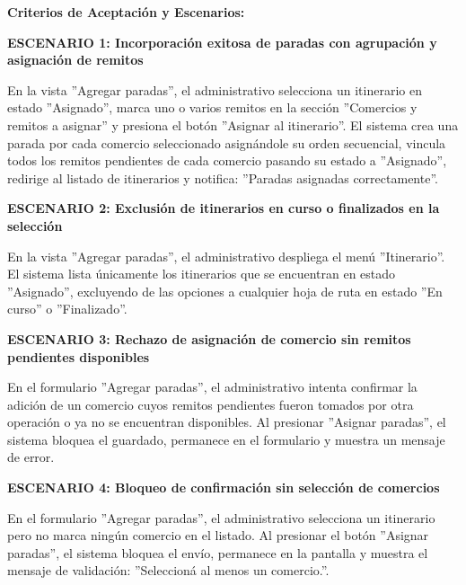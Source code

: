 \documentclass[a4paper,9pt]{article}
\begin{document}
\begin{tcolorbox}[hucard, title={\textbf{HU-46: AGREGAR PARADAS A UN ITINERARIO} \hfill \scriptsize \colorbox{tealstatus}{\textbf{\ Accepted\ }} \quad \colorbox{white}{\textcolor{primarydark}{\textbf{\ 5 pts\ }}}}]
{\begin{itemize}[leftmargin=12pt, nosep, itemsep=1.5pt, topsep=1pt]
\end{itemize}
}\par\vspace{3pt}
\noindent\textbf{\footnotesize Criterios de Aceptación y Escenarios:}\par\vspace{2pt}
{\footnotesize
\noindent\textbf{\textcolor{secondarydark}{ESCENARIO 1:  Incorporación exitosa de paradas con agrupación y asignación de remitos}}\par\vspace{1pt}
En la vista ''Agregar paradas'', el administrativo selecciona un itinerario en estado ''Asignado'', marca uno o varios remitos en la sección ''Comercios y remitos a asignar'' y presiona el botón ''Asignar al itinerario''. El sistema crea una parada por cada comercio seleccionado asignándole su orden secuencial, vincula todos los remitos pendientes de cada comercio pasando su estado a ''Asignado'', redirige al listado de itinerarios y notifica: ''Paradas asignadas correctamente''.\par\vspace{2.5pt}
\noindent\textbf{\textcolor{secondarydark}{ESCENARIO 2:  Exclusión de itinerarios en curso o finalizados en la selección}}\par\vspace{1pt}
En la vista ''Agregar paradas'', el administrativo despliega el menú ''Itinerario''. El sistema lista únicamente los itinerarios que se encuentran en estado ''Asignado'', excluyendo de las opciones a cualquier hoja de ruta en estado ''En curso'' o ''Finalizado''.\par\vspace{2.5pt}
\noindent\textbf{\textcolor{secondarydark}{ESCENARIO 3:  Rechazo de asignación de comercio sin remitos pendientes disponibles}}\par\vspace{1pt}
En el formulario ''Agregar paradas'', el administrativo intenta confirmar la adición de un comercio cuyos remitos pendientes fueron tomados por otra operación o ya no se encuentran disponibles. Al presionar ''Asignar paradas'', el sistema bloquea el guardado, permanece en el formulario y muestra un mensaje de error.\par\vspace{2.5pt}
\noindent\textbf{\textcolor{secondarydark}{ESCENARIO 4:  Bloqueo de confirmación sin selección de comercios}}\par\vspace{1pt}
En el formulario ''Agregar paradas'', el administrativo selecciona un itinerario pero no marca ningún comercio en el listado. Al presionar el botón ''Asignar paradas'', el sistema bloquea el envío, permanece en la pantalla y muestra el mensaje de validación: ''Seleccioná al menos un comercio.''.\par\vspace{2.5pt}
}\par
\end{tcolorbox}
\end{document}
